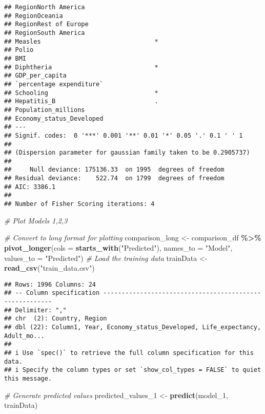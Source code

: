\documentclass[
]{article}
\newenvironment{Shaded}{\begin{snugshade}}{\end{snugshade}}
\newcommand{\AttributeTok}[1]{\textcolor[rgb]{0.13,0.29,0.53}{#1}}
\newcommand{\CommentTok}[1]{\textcolor[rgb]{0.56,0.35,0.01}{\textit{#1}}}
\newcommand{\FunctionTok}[1]{\textcolor[rgb]{0.13,0.29,0.53}{\textbf{#1}}}
\newcommand{\NormalTok}[1]{#1}
\newcommand{\OtherTok}[1]{\textcolor[rgb]{0.56,0.35,0.01}{#1}}
\newcommand{\SpecialCharTok}[1]{\textcolor[rgb]{0.81,0.36,0.00}{\textbf{#1}}}
\newcommand{\StringTok}[1]{\textcolor[rgb]{0.31,0.60,0.02}{#1}}
\begin{document}
\begin{verbatim}
## RegionNorth America                      
## RegionOceania                            
## RegionRest of Europe                     
## RegionSouth America                      
## Measles                               *  
## Polio                                    
## BMI                                      
## Diphtheria                            *  
## GDP_per_capita                           
## `percentage expenditure`                 
## Schooling                             *  
## Hepatitis_B                           .  
## Population_millions                      
## Economy_status_Developed                 
## ---
## Signif. codes:  0 '***' 0.001 '**' 0.01 '*' 0.05 '.' 0.1 ' ' 1
## 
## (Dispersion parameter for gaussian family taken to be 0.2905737)
## 
##     Null deviance: 175136.33  on 1995  degrees of freedom
## Residual deviance:    522.74  on 1799  degrees of freedom
## AIC: 3386.1
## 
## Number of Fisher Scoring iterations: 4
\end{verbatim}

\begin{Shaded}
\begin{Highlighting}[]
\CommentTok{\# Plot Models 1,2,3}

\CommentTok{\# Convert to long format for plotting}
\NormalTok{comparison\_long }\OtherTok{\textless{}{-}}\NormalTok{ comparison\_df }\SpecialCharTok{\%\textgreater{}\%}
  \FunctionTok{pivot\_longer}\NormalTok{(}\AttributeTok{cols =} \FunctionTok{starts\_with}\NormalTok{(}\StringTok{"Predicted"}\NormalTok{), }\AttributeTok{names\_to =} \StringTok{"Model"}\NormalTok{, }\AttributeTok{values\_to =} \StringTok{"Predicted"}\NormalTok{)}
\CommentTok{\# Load the training data}
\NormalTok{trainData }\OtherTok{\textless{}{-}} \FunctionTok{read\_csv}\NormalTok{(}\StringTok{"train\_data.csv"}\NormalTok{)}
\end{Highlighting}
\end{Shaded}

\begin{verbatim}
## Rows: 1996 Columns: 24
## -- Column specification --------------------------------------------------------
## Delimiter: ","
## chr  (2): Country, Region
## dbl (22): Column1, Year, Economy_status_Developed, Life_expectancy, Adult_mo...
## 
## i Use `spec()` to retrieve the full column specification for this data.
## i Specify the column types or set `show_col_types = FALSE` to quiet this message.
\end{verbatim}

\begin{Shaded}
\begin{Highlighting}[]
\CommentTok{\# Generate predicted values}
\NormalTok{predicted\_values\_1 }\OtherTok{\textless{}{-}} \FunctionTok{predict}\NormalTok{(model\_1, trainData)}
\end{Highlighting}
\end{Shaded}
\end{document}

